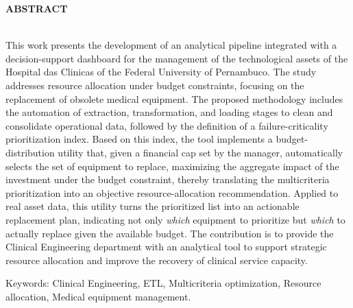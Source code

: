 \begin{center}
\textbf{ABSTRACT}
\end{center}

$\!$\\
\noindent
This work presents the development of an analytical pipeline integrated with a decision-support dashboard for the management of the technological assets of the Hospital das Clinicas of the Federal University of Pernambuco. The study addresses resource allocation under budget constraints, focusing on the replacement of obsolete medical equipment. The proposed methodology includes the automation of extraction, transformation, and loading stages to clean and consolidate operational data, followed by the definition of a failure-criticality prioritization index. Based on this index, the tool implements a budget-distribution utility that, given a financial cap set by the manager, automatically selects the set of equipment to replace, maximizing the aggregate impact of the investment under the budget constraint, thereby translating the multicriteria prioritization into an objective resource-allocation recommendation. Applied to real asset data, this utility turns the prioritized list into an actionable replacement plan, indicating not only \textit{which} equipment to prioritize but \textit{which} to actually replace given the available budget. The contribution is to provide the Clinical Engineering department with an analytical tool to support strategic resource allocation and improve the recovery of clinical service capacity.

\vspace{1cm}

\hspace{-1.3cm}Keywords: Clinical Engineering, ETL, Multicriteria optimization, Resource allocation, Medical equipment management.